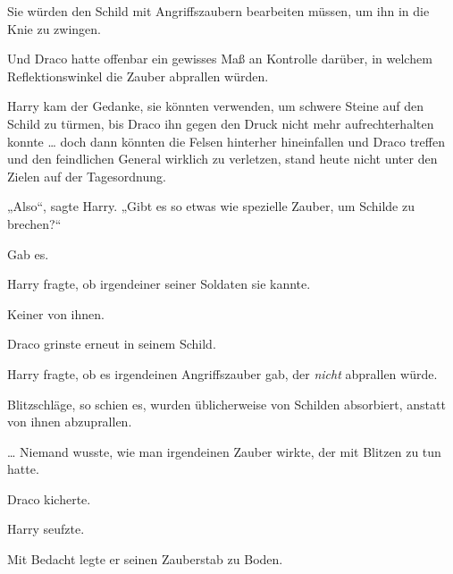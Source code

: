 Sie würden den Schild mit Angriffszaubern bearbeiten müssen, um ihn in die Knie zu zwingen.

Und Draco hatte offenbar ein gewisses Maß an Kontrolle darüber, in welchem Reflektionswinkel die Zauber abprallen würden.

Harry kam der Gedanke, sie könnten  verwenden, um schwere Steine auf den Schild zu türmen, bis Draco ihn gegen den Druck nicht mehr aufrechterhalten konnte … doch dann könnten die Felsen hinterher hineinfallen und Draco treffen und den feindlichen General wirklich zu verletzen, stand heute nicht unter den Zielen auf der Tagesordnung.

„Also“, sagte Harry.
„Gibt es so etwas wie spezielle Zauber, um Schilde zu brechen?“

Gab es.

Harry fragte, ob irgendeiner seiner Soldaten sie kannte.

Keiner von ihnen.

Draco grinste erneut in seinem Schild.

Harry fragte, ob es irgendeinen Angriffszauber gab, der \emph{nicht} abprallen würde.

Blitzschläge, so schien es, wurden üblicherweise von Schilden absorbiert, anstatt von ihnen abzuprallen.

… Niemand wusste, wie man irgendeinen Zauber wirkte, der mit Blitzen zu tun hatte.

Draco kicherte.

Harry seufzte.

Mit Bedacht legte er seinen Zauberstab zu Boden.

